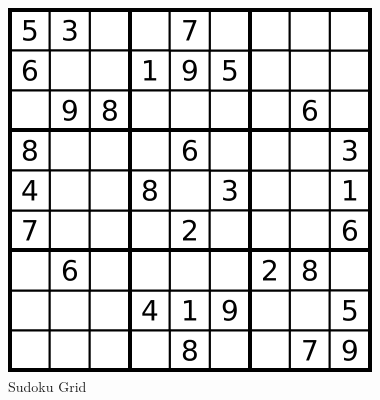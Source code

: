 \documentclass[10pt,twoside]{article}
\begin{document}
  \begin{figure}[h]
  \centering
    \includegraphics[scale=0.35]{sudoku} 
  \caption{Sudoku Grid} 
  \end{figure}

  




%
\end{document}
